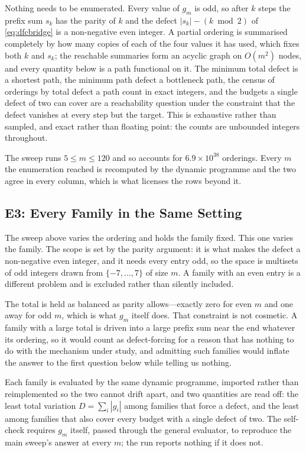 \documentclass[conference]{IEEEtran}
\theoremstyle{definition}
\begin{document}
Nothing needs to be enumerated. Every value of $g_{m}$ is odd, so after $k$ steps the prefix
sum $s_{k}$ has the parity of $k$ and the defect $|s_{k}|-(k\bmod 2)$ of \eqref{eq:dfcbridge}
is a non-negative even integer. A partial ordering is summarised completely by how many
copies of each of the four values it has used, which fixes both $k$ and $s_{k}$; the reachable
summaries form an acyclic graph on $O(m^{2})$ nodes, and every quantity below is a path
functional on it. The minimum total defect is a shortest path, the minimum path defect a
bottleneck path, the census of orderings by total defect a path count in exact integers, and
the budgets a single defect of two can cover are a reachability question under the constraint
that the defect vanishes at every step but the target. This is exhaustive rather than sampled,
and exact rather than floating point: the counts are unbounded integers throughout.

The sweep runs $5\le m\le120$ and so accounts for $6.9\times10^{38}$ orderings. Every $m$ the
enumeration reached is recomputed by the dynamic programme and the two agree in every
column, which is what licenses the rows beyond it.

\subsection{E3: Every Family in the Same Setting}
\label{sec:e3}

The sweep above varies the ordering and holds the family fixed. This one varies
the family. The scope is set by the parity argument: it is what makes the defect a
non-negative even integer, and it needs every entry odd, so the space is multisets
of odd integers drawn from $\{-7,\dots,7\}$ of size $m$. A family with an even
entry is a different problem and is excluded rather than silently included.

The total is held as balanced as parity allows---exactly zero for even $m$ and one
away for odd $m$, which is what $g_{m}$ itself does. That constraint is not
cosmetic. A family with a large total is driven into a large prefix sum near the
end whatever its ordering, so it would count as defect-forcing for a reason that
has nothing to do with the mechanism under study, and admitting such families
would inflate the answer to the first question below while telling us nothing.

Each family is evaluated by the same dynamic programme, imported rather than
reimplemented so the two cannot drift apart, and two quantities are read off: the
least total variation $D=\sum_{i}|g_{i}|$ among families that force a defect, and
the least among families that also cover every budget with a single defect of two.
The self-check requires $g_{m}$ itself, passed through the general evaluator, to
reproduce the main sweep's answer at every $m$; the run reports nothing if it does
not.
\end{document}
